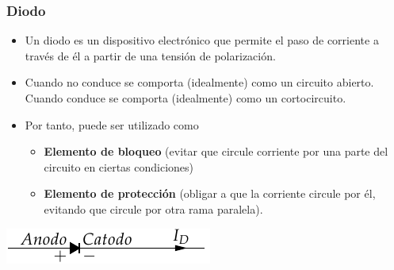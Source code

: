 \documentclass[serif, xcolor=dvipsnames]{beamer}
\begin{document}
\begin{frame}
  \frametitle{Diodo}
  \begin{itemize}
  \item Un diodo es un dispositivo electrónico que permite el paso de
    corriente a través de él a partir de una tensión de polarización.
  \item Cuando no conduce se comporta (idealmente) como un circuito
    abierto.  Cuando conduce se comporta (idealmente) como un
    cortocircuito.
  \item Por tanto, puede ser utilizado como

    \begin{itemize}
    \item \textbf{Elemento de bloqueo} (evitar que circule corriente
      por una parte del circuito en ciertas condiciones)
    \item \textbf{Elemento de protección} (obligar a que la corriente
      circule por él, evitando que circule por otra rama paralela).
    \end{itemize}
  \end{itemize}
  \begin{center}
    \includegraphics{../figs/Diodo}
    \par\end{center}


\end{frame}
\end{document}
